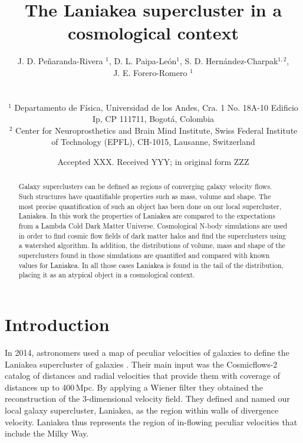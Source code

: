 \documentclass[usenatbib]{mnras}
\title[Laniakea in a cosmological context]{The Laniakea supercluster in a cosmological context}
\author[Pe\~naranda-Rivera et al.]{
\parbox[t]{\textwidth}{
    {J. D. Pe\~naranda-Rivera $^1$,} 
    {D. L. Paipa-Le\'on$^{1}$,}
    {S. D. Hern\'andez-Charpak$^{1,2}$,}\\
    {J. E. Forero-Romero $^{1}$}
}
\\\\
$^{1}$ Departamento de F\'isica, Universidad de los Andes, Cra. 1
  No. 18A-10 Edificio Ip, CP 111711, Bogot\'a, Colombia \\
$^{2}$ Center for Neuroprosthetics and Brain Mind Institute, Swiss
  Federal Institute of Technology (EPFL), CH-1015, Lausanne,
  Switzerland\\  
}
\date{Accepted XXX. Received YYY; in original form ZZZ}
\begin{document}
\label{firstpage}
\pagerange{\pageref{firstpage}--\pageref{lastpage}}
\maketitle

\maketitle
\begin{abstract}
Galaxy superclusters can be defined as regions of converging galaxy
velocity flows. 
Such structures have quantifiable properties such as mass, volume and
shape. 
The most precise quantification of such an object has been done on our local supercluster, Laniakea. 
In this work the properties of Laniakea are compared to the
expectations from a Lambda Cold Dark Matter Universe. 
Cosmological N-body simulations are used in order to find cosmic flow
fields of dark matter halos and find the superclusters using a
watershed algorithm. 
In addition, the distributions of volume, mass and shape of the
superclusters found in those simulations are quantified and compared
with known values for Laniakea. 
In all those cases Laniakea is found in the tail of the distribution,
placing it as an atypical object in a cosmological context.  
\end{abstract}

\begin{keywords}
\end{keywords}




\section{Introduction}

In 2014, astronomers used a map  of peculiar velocities of galaxies to
define the Laniakea supercluster of galaxies
\citep{2014Natur.513...71T}.  
Their main input was the Cosmicflows-2 catalog of distances and radial
velocities that provide them with coverage of distances up to 400\,Mpc. 
By applying a Wiener filter they obtained the reconstruction of the
3-dimensional velocity field. They defined and named our local galaxy supercluster, 
Laniakea, as the region within walls of divergence velocity.  
Laniakea thus represents the region of in-flowing peculiar velocities
that include the Milky Way. 
\end{document}
